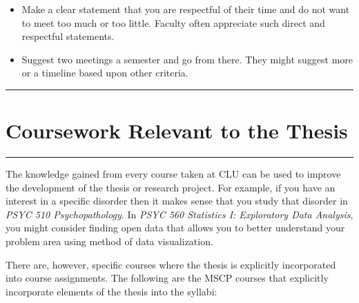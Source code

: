\documentclass[openany]{book}
\begin{document}
\begin{itemize}
\item
  Make a clear statement that you are respectful of their time and do not want to meet too much or too little. Faculty often appreciate such direct and respectful statements.
\item
  Suggest two meetings a semester and go from there. They might suggest more or a timeline based upon other criteria.
\end{itemize}

\begin{center}\rule{0.5\linewidth}{0.5pt}\end{center}

\hypertarget{coursework-relevant-to-the-thesis}{%
\chapter{Coursework Relevant to the Thesis}\label{coursework-relevant-to-the-thesis}}

\begin{center}\rule{0.5\linewidth}{0.5pt}\end{center}

The knowledge gained from every course taken at CLU can be used to improve the development of the thesis or research project. For example, if you have an interest in a specific disorder then it makes sense that you study that disorder in \emph{PSYC 510 Psychopathology}. In \emph{PSYC 560 Statistics I: Exploratory Data Analysis}, you might consider finding open data that allows you to better understand your problem area using method of data visualization.

There are, however, specific courses where the thesis is explicitly incorporated into course assignments. The following are the MSCP courses that explicitly incorporate elements of the thesis into the syllabi:
\end{document}
